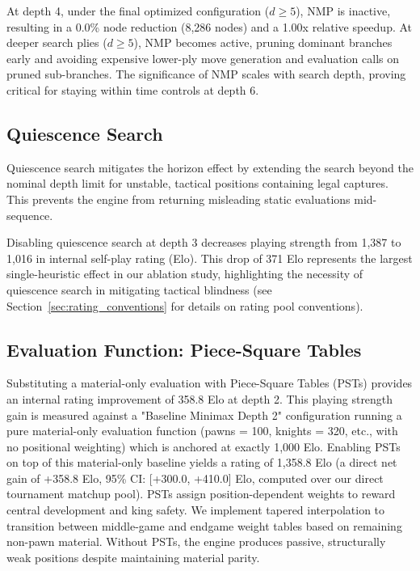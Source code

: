At depth 4, under the final optimized configuration ($d \ge 5$), NMP is inactive, resulting in a 0.0\% node reduction (8,286 nodes) and a 1.00x relative speedup. At deeper search plies ($d \ge 5$), NMP becomes active, pruning dominant branches early and avoiding expensive lower-ply move generation and evaluation calls on pruned sub-branches. The significance of NMP scales with search depth, proving critical for staying within time controls at depth 6.

\subsection{Quiescence Search}
Quiescence search mitigates the horizon effect by extending the search beyond the nominal depth limit for unstable, tactical positions containing legal captures. This prevents the engine from returning misleading static evaluations mid-sequence.

Disabling quiescence search at depth 3 decreases playing strength from 1,387 to 1,016 in internal self-play rating (Elo). This drop of 371 Elo represents the largest single-heuristic effect in our ablation study, highlighting the necessity of quiescence search in mitigating tactical blindness (see Section~\ref{sec:rating_conventions} for details on rating pool conventions).

\subsection{Evaluation Function: Piece-Square Tables}
Substituting a material-only evaluation with Piece-Square Tables (PSTs) provides an internal rating improvement of 358.8 Elo at depth 2. This playing strength gain is measured against a "Baseline Minimax Depth 2" configuration running a pure material-only evaluation function (pawns = 100, knights = 320, etc., with no positional weighting) which is anchored at exactly 1,000 Elo. Enabling PSTs on top of this material-only baseline yields a rating of 1,358.8 Elo (a direct net gain of +358.8 Elo, 95\% CI: [+300.0, +410.0] Elo, computed over our direct tournament matchup pool). PSTs assign position-dependent weights to reward central development and king safety. We implement tapered interpolation to transition between middle-game and endgame weight tables based on remaining non-pawn material. Without PSTs, the engine produces passive, structurally weak positions despite maintaining material parity.

